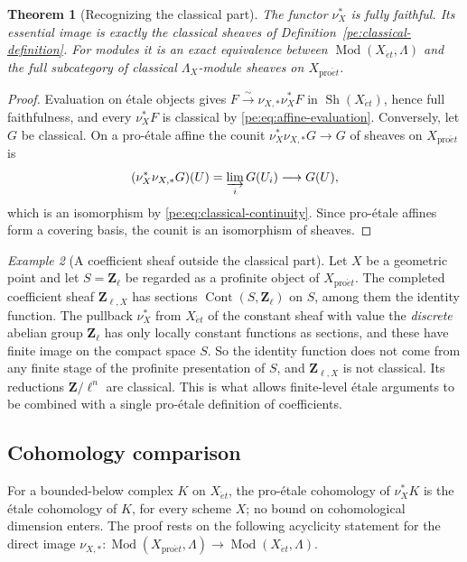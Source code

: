 \documentclass[11pt,a4paper]{article}
\numberwithin{equation}{section}
\newtheorem{theorem}{Theorem}[section]
\theoremstyle{definition}
\theoremstyle{remark}
\newcommand{\Sh}{\operatorname{Sh}}
\newcommand{\Mod}{\operatorname{Mod}}
\newcommand{\et}{\acute{e}t}
\newcommand{\proet}{\mathrm{pro}\acute{e}t}
\newtheorem{example}[theorem]{Example}
\begin{document}
\begin{theorem}[Recognizing the classical part]
\label{pe:classical-sheaves}
The functor $\nu_X^*$ is fully faithful. Its essential image is exactly
the classical sheaves of Definition~\ref{pe:classical-definition}.
For modules it is an exact equivalence between
$\Mod(X_{\et},\Lambda)$ and the full subcategory of classical
$\Lambda_X$-module sheaves on $X_{\proet}$.
\end{theorem}
\begin{proof}
Evaluation on \'etale objects gives
$F\xrightarrow{\sim}\nu_{X,*}\nu_X^*F$ in $\Sh(X_{\et})$, hence full
faithfulness, and
every $\nu_X^*F$ is classical by \eqref{pe:eq:affine-evaluation}.
Conversely, let $G$ be classical. On a pro-\'etale affine the counit
$\nu_X^*\nu_{X,*}G\to G$ of sheaves on $X_{\proet}$ is
\[
 (\nu_X^*\nu_{X,*}G)(U)
  =\varinjlim_iG(U_i)\longrightarrow G(U),
\]
which is an isomorphism by \eqref{pe:eq:classical-continuity}. Since
pro-\'etale affines form a covering basis, the counit is an
isomorphism of sheaves.
\end{proof}

\begin{example}[A coefficient sheaf outside the classical part]
\label{pe:nonclassical-example}
Let $X$ be a geometric point and let $S=\mathbf Z_\ell$ be regarded as
a profinite object of $X_{\proet}$. The completed coefficient sheaf
$\mathbf Z_{\ell,X}$ has sections
$\operatorname{Cont}(S,\mathbf Z_\ell)$ on $S$, among them the
identity function. The pullback $\nu_X^*$ from $X_{\et}$ of the
constant sheaf with value the \emph{discrete} abelian group
$\mathbf Z_\ell$ has only locally
constant functions as sections, and these have finite image on the
compact space $S$. So the identity function does not come from any
finite stage of the profinite presentation of $S$, and
$\mathbf Z_{\ell,X}$ is not classical. Its reductions
$\mathbf Z/\ell^n$ are classical. This is what allows finite-level
\'etale arguments to be combined with a single pro-\'etale definition
of coefficients.
\end{example}

\subsection{Cohomology comparison}
\label{pe:derived-comparison-section}
For a bounded-below complex $K$ on $X_{\et}$, the pro-\'etale
cohomology of $\nu_X^*K$ is the \'etale cohomology of $K$, for every
scheme $X$; no bound on cohomological dimension enters. The proof rests
on the following acyclicity statement for the direct image
$\nu_{X,*}\colon\Mod(X_{\proet},\Lambda)\to\Mod(X_{\et},\Lambda)$.
\end{document}
